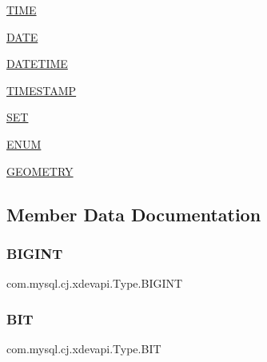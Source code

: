 \begin{DoxyCompactItemize}
\mbox{\hyperlink{enumcom_1_1mysql_1_1cj_1_1xdevapi_1_1_type_aeb9d3c4f13ced97b450e2f2ea833dc19}{T\+I\+ME}}
\item 
\mbox{\hyperlink{enumcom_1_1mysql_1_1cj_1_1xdevapi_1_1_type_aab43e5873a8cf2e20b6fcf6febc7b762}{D\+A\+TE}}
\item 
\mbox{\hyperlink{enumcom_1_1mysql_1_1cj_1_1xdevapi_1_1_type_afa9722b757f69347c6a9865e47590e99}{D\+A\+T\+E\+T\+I\+ME}}
\item 
\mbox{\hyperlink{enumcom_1_1mysql_1_1cj_1_1xdevapi_1_1_type_a89eac0e7bda62933c6e45cc78e6bb3dc}{T\+I\+M\+E\+S\+T\+A\+MP}}
\item 
\mbox{\hyperlink{enumcom_1_1mysql_1_1cj_1_1xdevapi_1_1_type_ad0a84c95791e485d5336699e01bb7229}{S\+ET}}
\item 
\mbox{\hyperlink{enumcom_1_1mysql_1_1cj_1_1xdevapi_1_1_type_a4032058edeb64defeb355ed2d1c67fff}{E\+N\+UM}}
\item 
\mbox{\hyperlink{enumcom_1_1mysql_1_1cj_1_1xdevapi_1_1_type_a02bbafd70fb2c78619d42b3deaaa3a34}{G\+E\+O\+M\+E\+T\+RY}}
\end{DoxyCompactItemize}


\subsection{Member Data Documentation}
\mbox{\label{enumcom_1_1mysql_1_1cj_1_1xdevapi_1_1_type_a2d52786ebe465aa72338f620f0010f61}} 
\subsubsection{\texorpdfstring{B\+I\+G\+I\+NT}{BIGINT}}
{\footnotesize\ttfamily com.\+mysql.\+cj.\+xdevapi.\+Type.\+B\+I\+G\+I\+NT}

\mbox{\label{enumcom_1_1mysql_1_1cj_1_1xdevapi_1_1_type_a8f14a97660638252f65e42167d357250}} 
\subsubsection{\texorpdfstring{B\+IT}{BIT}}
{\footnotesize\ttfamily com.\+mysql.\+cj.\+xdevapi.\+Type.\+B\+IT}

